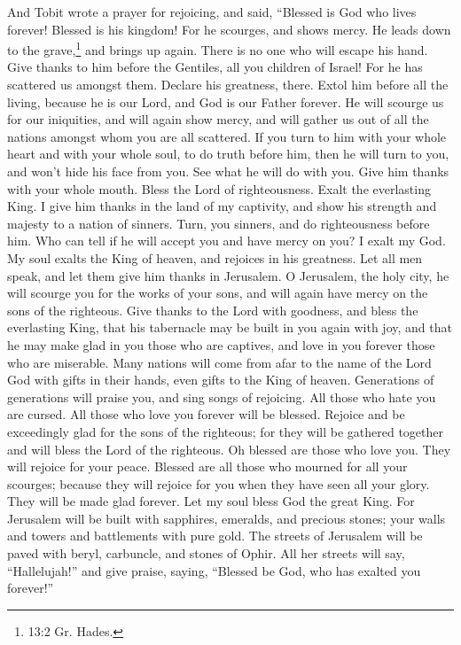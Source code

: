  And Tobit wrote a prayer for rejoicing, and said, ``Blessed
is God who lives forever! Blessed is his kingdom!  For he
scourges, and shows mercy. He leads down to the grave,\footnote{13:2 Gr.
  Hades.} and brings up again. There is no one who will escape his hand.
 Give thanks to him before the Gentiles, all you children of
Israel! For he has scattered us amongst them.  Declare his
greatness, there. Extol him before all the living, because he is our
Lord, and God is our Father forever.  He will scourge us for
our iniquities, and will again show mercy, and will gather us out of all
the nations amongst whom you are all scattered.  If you turn
to him with your whole heart and with your whole soul, to do truth
before him, then he will turn to you, and won't hide his face from you.
See what he will do with you. Give him thanks with your whole mouth.
Bless the Lord of righteousness. Exalt the everlasting King. I give him
thanks in the land of my captivity, and show his strength and majesty to
a nation of sinners. Turn, you sinners, and do righteousness before him.
Who can tell if he will accept you and have mercy on you?  I
exalt my God. My soul exalts the King of heaven, and rejoices in his
greatness.  Let all men speak, and let them give him thanks
in Jerusalem.  O Jerusalem, the holy city, he will scourge
you for the works of your sons, and will again have mercy on the sons of
the righteous.  Give thanks to the Lord with goodness, and
bless the everlasting King, that his tabernacle may be built in you
again with joy, and that he may make glad in you those who are captives,
and love in you forever those who are miserable.  Many
nations will come from afar to the name of the Lord God with gifts in
their hands, even gifts to the King of heaven. Generations of
generations will praise you, and sing songs of rejoicing. 
All those who hate you are cursed. All those who love you forever will
be blessed.  Rejoice and be exceedingly glad for the sons
of the righteous; for they will be gathered together and will bless the
Lord of the righteous.  Oh blessed are those who love you.
They will rejoice for your peace. Blessed are all those who mourned for
all your scourges; because they will rejoice for you when they have seen
all your glory. They will be made glad forever.  Let my
soul bless God the great King.  For Jerusalem will be built
with sapphires, emeralds, and precious stones; your walls and towers and
battlements with pure gold.  The streets of Jerusalem will
be paved with beryl, carbuncle, and stones of Ophir.  All
her streets will say, ``Hallelujah!'' and give praise, saying, ``Blessed
be God, who has exalted you forever!''


